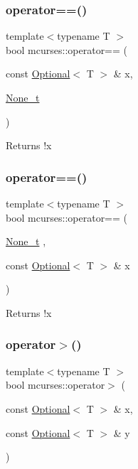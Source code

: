 \subsubsection{\texorpdfstring{operator==()}{operator==()}\hspace{0.1cm}{\footnotesize\ttfamily [2/3]}}
{\footnotesize\ttfamily template$<$typename T $>$ \\
bool mcurses\+::operator== (\begin{DoxyParamCaption}\item[{const \hyperlink{classmcurses_1_1Optional}{Optional}$<$ T $>$ \&}]{x,  }\item[{\hyperlink{classmcurses_1_1None__t}{None\+\_\+t}}]{ }\end{DoxyParamCaption})\hspace{0.3cm}{\ttfamily [noexcept]}}

\begin{DoxyReturn}{Returns}
!x 
\end{DoxyReturn}
\hypertarget{namespacemcurses_a0239af7ea07a44819bf660e8209d8d7a}{}\label{namespacemcurses_a0239af7ea07a44819bf660e8209d8d7a} 
\subsubsection{\texorpdfstring{operator==()}{operator==()}\hspace{0.1cm}{\footnotesize\ttfamily [3/3]}}
{\footnotesize\ttfamily template$<$typename T $>$ \\
bool mcurses\+::operator== (\begin{DoxyParamCaption}\item[{\hyperlink{classmcurses_1_1None__t}{None\+\_\+t}}]{,  }\item[{const \hyperlink{classmcurses_1_1Optional}{Optional}$<$ T $>$ \&}]{x }\end{DoxyParamCaption})\hspace{0.3cm}{\ttfamily [noexcept]}}

\begin{DoxyReturn}{Returns}
!x 
\end{DoxyReturn}
\hypertarget{namespacemcurses_af8434742661ed6b43f86a0d38b725a84}{}\label{namespacemcurses_af8434742661ed6b43f86a0d38b725a84} 
\subsubsection{\texorpdfstring{operator$>$()}{operator>()}}
{\footnotesize\ttfamily template$<$typename T $>$ \\
bool mcurses\+::operator$>$ (\begin{DoxyParamCaption}\item[{const \hyperlink{classmcurses_1_1Optional}{Optional}$<$ T $>$ \&}]{x,  }\item[{const \hyperlink{classmcurses_1_1Optional}{Optional}$<$ T $>$ \&}]{y }\end{DoxyParamCaption})}

